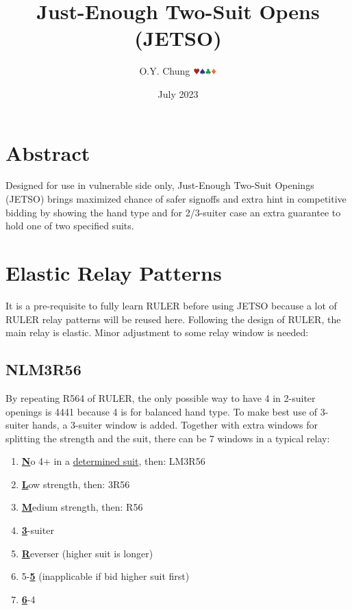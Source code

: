 \documentclass{article}
\title{Just-Enough Two-Suit Opens (JETSO)}
\author{O.Y. Chung $\hhh\sss\ccc\ddd$}
\date{July 2023}
\begin{document}
\begin{CJK*}{UTF8}{gbsn}
\end{CJK*}
\maketitle

\begin{multicols}{2}

\section{Abstract}
Designed for use in vulnerable side only, Just-Enough Two-Suit Openings (JETSO) brings maximized chance of safer signoffs and extra hint in competitive bidding by showing the hand type and for 2/3-suiter case an extra guarantee to hold one of two specified suits.

\section{Elastic Relay Patterns}
It is a pre-requisite to fully learn RULER before using JETSO because a lot of RULER relay patterns will be reused here.  Following the design of RULER, the main relay is elastic. Minor adjustment to some relay window is needed:
\subsection{NLM3R56}\label{sec:nlm3r56}
By repeating R564 of RULER, the only possible way to have 4 in 2-suiter openings is 4441 because 4 is for balanced hand type. To make best use of 3-suiter hands, a 3-suiter window is added. Together with extra windows for splitting the strength and the suit, there can be 7 windows in a typical relay:
\begin{enumerate}
    \item \textbf{\underline{N}}o 4+ in a \hyperref[sec:determine-n-suit]{determined suit}, then: LM3R56
    \item \textbf{\underline{L}}ow strength, then: 3R56
    \item \textbf{\underline{M}}edium strength, then: R56
    \item \textbf{\underline{3}}-suiter
    \item \textbf{\underline{R}}everser (higher suit is longer)
    \item 5-\textbf{\underline{5}} (inapplicable if bid higher suit first)
    \item \textbf{\underline{6}}-4
\end{enumerate}


\end{multicols}
\end{document}
